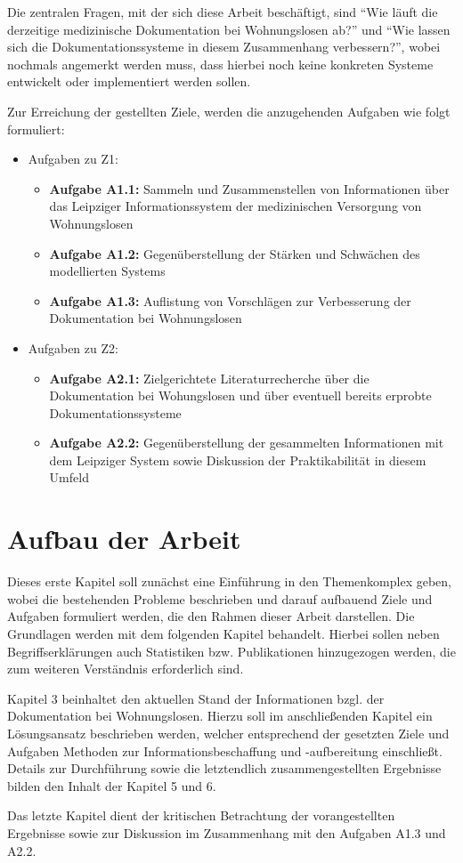 Die zentralen Fragen, mit der sich diese Arbeit beschäftigt, sind \enquote{Wie läuft die derzeitige medizinische Dokumentation bei Wohnungslosen ab?} und \enquote{Wie lassen sich die Dokumentationssysteme in diesem Zusammenhang verbessern?}, wobei nochmals angemerkt werden muss, dass hierbei noch keine konkreten Systeme entwickelt oder implementiert werden sollen.

Zur Erreichung der gestellten Ziele, werden die anzugehenden Aufgaben wie folgt formuliert:

\begin{itemize}
	\item Aufgaben zu Z1:
	\begin{itemize}
		\item \textbf{Aufgabe A1.1:} Sammeln und Zusammenstellen von Informationen über das Leipziger Informationssystem der medizinischen Versorgung von Wohnungslosen
		\item \textbf{Aufgabe A1.2:} Gegenüberstellung der Stärken und Schwächen des modellierten Systems
		\item \textbf{Aufgabe A1.3:} Auflistung von Vorschlägen zur Verbesserung der Dokumentation bei Wohnungslosen
	\end{itemize}
	\item Aufgaben zu Z2:
	\begin{itemize}
		\item \textbf{Aufgabe A2.1:} Zielgerichtete Literaturrecherche über die Dokumentation bei Wohungslosen und über eventuell bereits erprobte Dokumentationssysteme
		\item \textbf{Aufgabe A2.2:} Gegenüberstellung der gesammelten Informationen mit dem Leipziger System sowie Diskussion der Praktikabilität in diesem Umfeld
	\end{itemize}
\end{itemize}

\section{Aufbau der Arbeit}

Dieses erste Kapitel soll zunächst eine Einführung in den Themenkomplex geben, wobei die bestehenden Probleme beschrieben und darauf aufbauend Ziele und Aufgaben formuliert werden, die den Rahmen dieser Arbeit darstellen. Die Grundlagen werden mit dem folgenden Kapitel behandelt. Hierbei sollen neben Begriffserklärungen auch Statistiken bzw. Publikationen hinzugezogen werden, die zum weiteren Verständnis erforderlich sind.

Kapitel 3 beinhaltet den aktuellen Stand der Informationen bzgl. der Dokumentation bei Wohnungslosen. Hierzu soll im anschließenden Kapitel ein Lösungsansatz beschrieben werden, welcher entsprechend der gesetzten Ziele und Aufgaben Methoden zur Informationsbeschaffung und -aufbereitung einschließt. Details zur Durchführung sowie die letztendlich zusammengestellten Ergebnisse bilden den Inhalt der Kapitel 5 und 6.

Das letzte Kapitel dient der kritischen Betrachtung der vorangestellten Ergebnisse sowie zur Diskussion im Zusammenhang mit den Aufgaben A1.3 und A2.2.